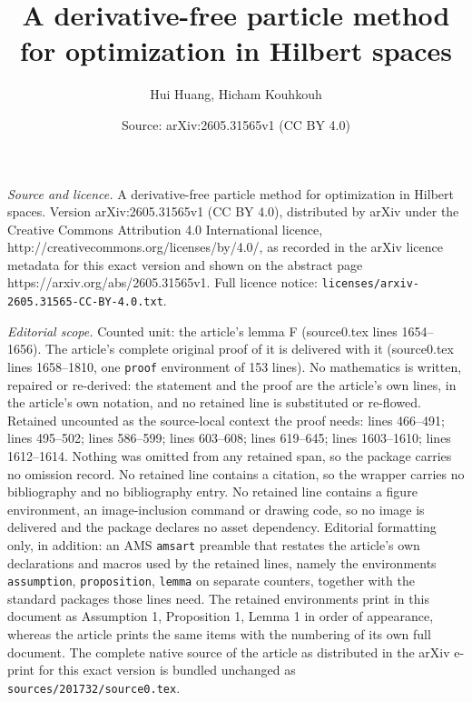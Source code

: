 \documentclass[10pt,a4paper]{amsart}
\title{A derivative-free particle method for optimization in Hilbert spaces}
\author{Hui Huang, Hicham Kouhkouh}
\date{Source: arXiv:2605.31565v1 (CC BY 4.0)}
\begin{document}
\maketitle

\noindent\emph{Source and licence.} A derivative-free particle method for optimization in Hilbert spaces. Version arXiv:2605.31565v1 (CC BY 4.0), distributed by arXiv under the Creative Commons Attribution 4.0 International licence, http://creativecommons.org/licenses/by/4.0/, as recorded in the arXiv licence metadata for this exact version and shown on the abstract page https://arxiv.org/abs/2605.31565v1. Full licence notice: \texttt{licenses/arxiv-2605.31565-CC-BY-4.0.txt}.\par\smallskip

\noindent\textit{Editorial scope.} Counted unit: the article's lemma F (source0.tex lines 1654--1656). The article's complete original proof of it is delivered with it (source0.tex lines 1658--1810, one \texttt{proof} environment of 153 lines). No mathematics is written, repaired or re-derived: the statement and the proof are the article's own lines, in the article's own notation, and no retained line is substituted or re-flowed.  Retained uncounted as the source-local context the proof needs: lines 466--491; lines 495--502; lines 586--599; lines 603--608; lines 619--645; lines 1603--1610; lines 1612--1614.  Nothing was omitted from any retained span, so the package carries no omission record.  No retained line contains a citation, so the wrapper carries no bibliography and no bibliography entry.  No retained line contains a figure environment, an image-inclusion command or drawing code, so no image is delivered and the package declares no asset dependency.  Editorial formatting only, in addition: an AMS \texttt{amsart} preamble that restates the article's own declarations and macros used by the retained lines, namely the environments \texttt{assumption}, \texttt{proposition}, \texttt{lemma} on separate counters, together with the standard packages those lines need.  The retained environments print in this document as Assumption 1, Proposition 1, Lemma 1 in order of appearance, whereas the article prints the same items with the numbering of its own full document.  The complete native source of the article as distributed in the arXiv e-print for this exact version is bundled unchanged as \texttt{sources/201732/source0.tex}.
\end{document}
